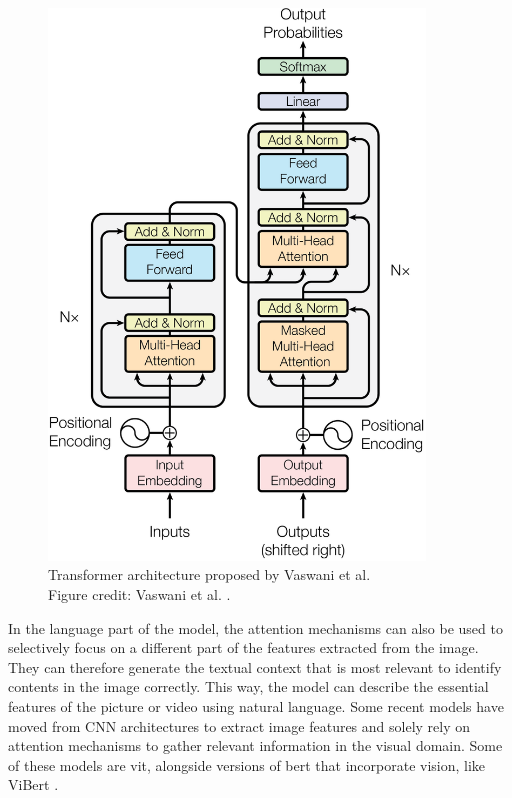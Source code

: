    \begin{figure}[htb]
        \centering
        \centerline{
        \includegraphics[width=10cm]{images/Transformer_architecture.png}}
        \caption[Transformer architecture proposed by Vaswani et al.]{Transformer architecture proposed by Vaswani et al.\\
        Figure credit: Vaswani et al. \cite{vaswaniAttentionAllYou2017}.}
        \label{fig:transformer_architecture}
    \end{figure}
    
    In the language part of the model, the attention mechanisms can also be used to selectively focus on a different part of the features extracted from the image. They can therefore generate the textual context that is most relevant to identify contents in the image correctly. This way, the model can describe the essential features of the picture or video using natural language. Some recent models have moved from CNN architectures to extract image features and solely rely on attention mechanisms to gather relevant information in the visual domain. Some of these models are \gls{vit}, alongside versions of \gls{bert} that incorporate vision, like ViBert \cite{leiLessMoreClipBERT2021, liVisualBERTSimplePerformant2019, suVLBERTPretrainingGeneric2020}. %

